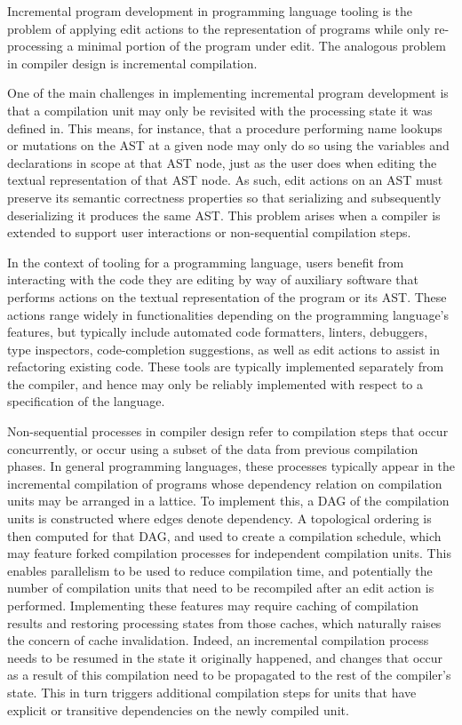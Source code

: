 Incremental program development in programming language tooling is the problem of applying edit actions to the representation of programs while only re-processing a minimal portion of the program under edit.
The analogous problem in compiler design is incremental compilation.

One of the main challenges in implementing incremental program development is that a compilation unit may only be revisited with the processing state it was defined in.
This means, for instance, that a procedure performing name lookups or mutations on the \ac{AST} at a given node may only do so using the variables and declarations in scope at that \ac{AST} node, just as the user does when editing the textual representation of that \ac{AST} node.
As such, edit actions on an \ac{AST} must preserve its semantic correctness properties so that serializing and subsequently deserializing it produces the same \ac{AST}.
This problem arises when a compiler is extended to support user interactions or non-sequential compilation steps.

In the context of tooling for a programming language, users benefit from interacting with the code they are editing by way of auxiliary software that performs actions on the textual representation of the program or its \ac{AST}.
These actions range widely in functionalities depending on the programming language's features, but typically include automated code formatters, linters, debuggers, type inspectors, code-completion suggestions, as well as edit actions to assist in refactoring existing code.
These tools are typically implemented separately from the compiler, and hence may only be reliably implemented with respect to a specification of the language.

Non-sequential processes in compiler design refer to compilation steps that occur concurrently, or occur using a subset of the data from previous compilation phases.
In general programming languages, these processes typically appear in the incremental compilation of programs whose dependency relation on compilation units may be arranged in a lattice.
To implement this, a \ac{DAG} of the compilation units is constructed where edges denote dependency.
A topological ordering is then computed for that \ac{DAG}, and used to create a compilation schedule, which may feature forked compilation processes for independent compilation units.
This enables parallelism to be used to reduce compilation time, and potentially the number of compilation units that need to be recompiled after an edit action is performed.
Implementing these features may require caching of compilation results and restoring processing states from those caches, which naturally raises the concern of cache invalidation.
Indeed, an incremental compilation process needs to be resumed in the state it originally happened, and changes that occur as a result of this compilation need to be propagated to the rest of the compiler's state.
This in turn triggers additional compilation steps for units that have explicit or transitive dependencies on the newly compiled unit.

